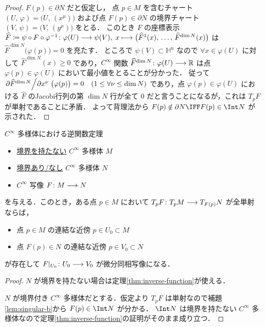 \documentclass[geometry_main]{subfiles}
\begin{document}
\begin{proof}
    $F(p) \in \partial N$ だと仮定し， 
    点 $p \in M$ を含むチャート $(U,\, \varphi) = \bigl( U,\, (x^\mu) \bigr) $ および点 $F(p) \in \partial N$ の境界チャート $(V,\, \psi) = \bigl( V,\, (y^\mu) \bigr) $ をとる．
    このとき $F$ の座標表示 $\widehat{F} \coloneqq \psi \circ F \circ \varphi^{-1} \colon \varphi(U) \longrightarrow \psi(V),\; x \longmapsto \bigl( \widehat{F}^1(x),\, \dots,\, \widehat{F}^{\dim N}(x) \bigr)$ は $\widehat{F}^{\dim N} \bigl( \varphi(p) \bigr) = 0$ を充たす．
    ところで $\psi(V) \subset \mathbb{H}^n$ なので $\forall x \in \varphi(U)$ に対して $\widehat{F}^{\dim N} (x) \ge 0$ であり，$C^\infty$ 関数 $\widehat{F}^{\dim N} \colon \varphi(U) \longrightarrow \mathbb{R}$ は点 $\varphi(p) \in \varphi(U)$ において最小値をとることが分かった．
    従って $\pdv*{\widehat{F}^{\dim N}}{x^\nu} ()\bigl(\varphi(p)\bigr) = 0\quad (1 \le \forall \nu \le \dim N)$ であり，点 $\varphi(p) \in \varphi(U)$ における $\widehat{F}$ のJacobi行列の第 $\dim N$ 行が全て $0$ だと言うことになるが，これは $T_p F$ が単射であることに矛盾．
    よって背理法から $F(p) \notin \partial N \IFF F(p) \in \Int N$ が示された．
\end{proof}

\begin{mytheo}[label=thm:inverse-function-b]{$C^\infty$ 多様体における逆関数定理}
    \begin{itemize}
        \item \underline{境界を持たない} $C^\infty$ 多様体 $M$
        \item \underline{境界あり/なし} $C^\infty$ 多様体 $N$
        \item $C^\infty$ 写像 $F \colon M \longrightarrow N$
    \end{itemize}
    を与える．このとき，ある点 $p \in M$ において $T_p F \colon T_p M \longrightarrow T_{F(p)} N$ が全単射ならば，
    \begin{itemize}
        \item 点 $p \in M$ の連結な近傍 $p \in U_0 \subset M$
        \item 点 $F(p) \in N$ の連結な近傍 $p \in V_0 \subset N$
    \end{itemize}
    が存在して $F|_{U_0} \colon U_0 \longrightarrow V_0$ が微分同相写像になる．
\end{mytheo}

\begin{proof}
    $N$ が境界を持たない場合は定理\ref{thm:inverse-function}が使える．

    $N$ が境界付き $C^\infty$ 多様体だとする．仮定より $T_p F$ は単射なので補題\ref{lem:singular-b}から $F(p) \in \Int N$ が分かる．
    $\Int N$ は境界を持たない $C^\infty$ 多様体なので定理\ref{thm:inverse-function}の証明がそのまま成り立つ．

\end{proof}
\end{document}
